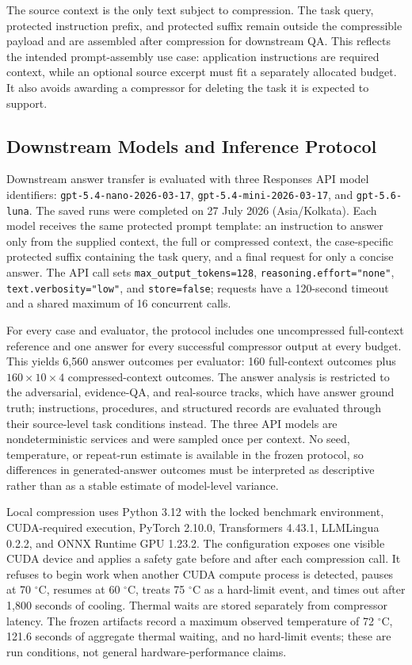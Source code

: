 \documentclass[
]{article}
\newcounter{none} %
\begin{document}
The source context is the only text subject to compression. The task
query, protected instruction prefix, and protected suffix remain outside
the compressible payload and are assembled after compression for
downstream QA. This reflects the intended prompt-assembly use case:
application instructions are required context, while an optional source
excerpt must fit a separately allocated budget. It also avoids awarding
a compressor for deleting the task it is expected to support.

\subsection{Downstream Models and Inference
Protocol}\label{downstream-models-and-inference-protocol}

Downstream answer transfer is evaluated with three Responses API model
identifiers: \texttt{gpt-5.4-nano-2026-03-17},
\texttt{gpt-5.4-mini-2026-03-17}, and \texttt{gpt-5.6-luna}. The saved
runs were completed on 27 July 2026 (Asia/Kolkata). Each model receives
the same protected prompt template: an instruction to answer only from
the supplied context, the full or compressed context, the case-specific
protected suffix containing the task query, and a final request for only
a concise answer. The API call sets \texttt{max\_output\_tokens=128},
\texttt{reasoning.effort="none"}, \texttt{text.verbosity="low"}, and
\texttt{store=false}; requests have a 120-second timeout and a shared
maximum of 16 concurrent calls.

For every case and evaluator, the protocol includes one uncompressed
full-context reference and one answer for every successful compressor
output at every budget. This yields 6,560 answer outcomes per evaluator: 160
full-context outcomes plus \(160 \times 10 \times 4\) compressed-context
outcomes. The answer analysis is restricted to the adversarial, evidence-QA,
and real-source tracks, which have answer ground truth; instructions,
procedures, and structured records are evaluated through their
source-level task conditions instead. The three API models are
nondeterministic services and were sampled once per context. No seed,
temperature, or repeat-run estimate is available in the frozen protocol,
so differences in generated-answer outcomes must be interpreted as
descriptive rather than as a stable estimate of model-level variance.

Local compression uses Python 3.12 with the locked benchmark
environment, CUDA-required execution, PyTorch 2.10.0, Transformers
4.43.1, LLMLingua 0.2.2, and ONNX Runtime GPU 1.23.2. The configuration
exposes one visible CUDA device and applies a safety gate before and
after each compression call. It refuses to begin work when another CUDA
compute process is detected, pauses at 70 \(^\circ\)C, resumes at 60
\(^\circ\)C, treats 75 \(^\circ\)C as a hard-limit event, and times out
after 1,800 seconds of cooling. Thermal waits are stored separately from
compressor latency. The frozen artifacts record a maximum observed
temperature of 72 \(^\circ\)C, 121.6 seconds of aggregate thermal
waiting, and no hard-limit events; these are run conditions, not general
hardware-performance claims.
\end{document}
